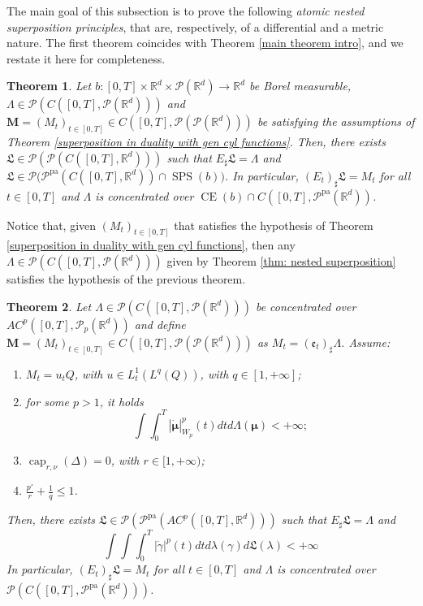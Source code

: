 \documentclass[10pt,leqno]{amsart}
\numberwithin{equation}{section}
\newtheorem{teorema}{Theorem}[section]
\newcommand{\R}{\mathbb{R}}
\newcommand{\Q}{\mathbb{Q}}
\newcommand{\PP}{\mathcal{P}}
\newcommand{\PPpa}{\PP^{\operatorname{pa}}}
\renewcommand{\Q}{Q}
\begin{document}
The main goal of this subsection is to prove the following \textit{atomic nested superposition principles}, that are, respectively, of a differential and a metric nature. The first theorem coincides with Theorem \ref{main theorem intro}, and we restate it here for completeness.

\begin{teorema}\label{main theorem}
    Let $b:[0,T]\times \R^d \times \PP(\R^d) \to \R^d$ be Borel measurable, $\Lambda \in \PP(C([0,T],\PP(\R^d)))$ and $\boldsymbol{M} = (M_t)_{t\in[0,T]}\in C([0,T],\PP(\PP(\R^d)))$ be satisfying the assumptions of Theorem \ref{superposition in duality with gen cyl functions}. Then, there exists $\mathfrak{L}\in \PP(\PP(C([0,T],\R^d)))$ such that $E_\sharp \mathfrak{L} = \Lambda$ and $\mathfrak{L}\in \PP\big( \PPpa(C([0,T],\R^d)) \cap \operatorname{SPS}(b) \big)$. In particular, $(E_t)_\sharp \mathfrak{L} = M_t$ for all $t\in[0,T]$ and $\Lambda$ is concentrated over $\operatorname{CE}(b)\cap C([0,T],\PP^{\operatorname{pa}}(\R^d))$.
\end{teorema}

Notice that, given $(M_t)_{t\in[0,T]}$ that satisfies the hypothesis of Theorem \ref{superposition in duality with gen cyl functions}, then any $\Lambda \in \PP(C([0,T],\PP(\R^d)))$ given by Theorem \eqref{thm: nested superposition} satisfies the hypothesis of the previous theorem.

\begin{teorema}\label{main theorem metric}
    Let $\Lambda \in \PP(C([0,T],\PP(\R^d)))$ be concentrated over $AC^p([0,T],\PP_p(\R^d))$ and define $\boldsymbol{M} = (M_t)_{t\in[0,T]} \in C([0,T],\PP(\PP(\R^d)))$ as $M_t = (\mathfrak{e}_t)_\sharp \Lambda$. Assume:
    \begin{enumerate}
        \item $M_t = u_t \Q$, with $u \in L^1_t(L^q(\Q))$, with $q\in[1,+\infty]$;
        \item for some $p>1$, it holds
        \begin{equation}
            \int\int_0^T |\dot{\boldsymbol{\mu}}|_{W_p}^p(t)dt d\Lambda(\boldsymbol{\mu})<+\infty;
        \end{equation}
        \item $\operatorname{cap}_{r,\nu}(\Delta) = 0$, with $r\in [1,+\infty)$;
        \item $\frac{p'}{r}+\frac{1}{q}\leq1$.
    \end{enumerate}
    Then, there exists $\mathfrak{L}\in \PP(\PPpa(AC^p([0,T],\R^d)))$ such that $E_\sharp \mathfrak{L} = \Lambda$ and 
    \begin{equation}\label{eq: minimal lifting}
        \int\int\int_0^T |\dot\gamma|^p(t) dt d\lambda (\gamma)d\mathfrak{L}(\lambda) <+\infty
    \end{equation}
    In particular, $(E_t)_\sharp \mathfrak{L} = M_t$ for all $t\in[0,T]$ and $\Lambda$ is concentrated over $\PP(C([0,T],\PP^{\operatorname{pa}}(\R^d)))$.
\end{teorema}
\end{document}
